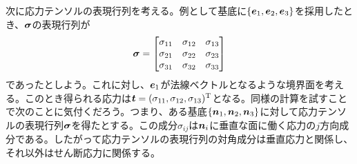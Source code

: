 \documentclass[dvipdfmx, 9pt, a4paper]{jsarticle}
\numberwithin{equation}{section}
\newcommand{\bm}[1]{{\mbox{\boldmath $#1$}}}
\begin{document}
次に応力テンソルの表現行列を考える。例として基底に$\{\bm e_1, \bm e_2, \bm e_3\}$を採用したとき、$\bm \sigma$の表現行列が
\begin{equation}
\bm \sigma = 
\begin{bmatrix}
\sigma_{11} & \sigma_{12} & \sigma_{13} \\
\sigma_{21} & \sigma_{22} & \sigma_{23} \\
\sigma_{31} & \sigma_{32} & \sigma_{33} \\
\end{bmatrix} \notag
\end{equation}
であったとしよう。これに対し、$\bm e_1$が法線ベクトルとなるような境界面を考える。このとき得られる応力は$\bm t=(\sigma_{11}, \sigma_{12}, \sigma_{13})^{\rm T}$となる。同様の計算を試すことで次のことに気付くだろう。つまり、ある基底$\{\bm n_1, \bm n_2, \bm n_3 \}$に対して応力テンソルの表現行列$\bm \sigma$を得たとする。この成分$\sigma_{ij}$は$\bm n_i$に垂直な面に働く応力の$j$方向成分である。したがって応力テンソルの表現行列の対角成分は垂直応力と関係し、それ以外はせん断応力に関係する。
\end{document}
